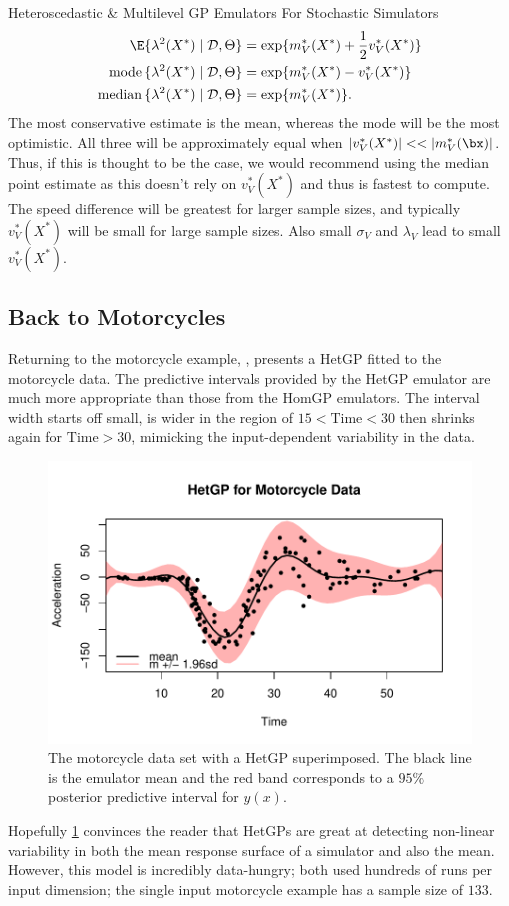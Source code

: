 \begin{chapter}{Heteroscedastic \& Multilevel GP Emulators For Stochastic Simulators\label{Ch:Hetsml}}
\begin{align}
	\E \{\lambda^2(X^*) \mid \mathcal{D}, \Theta \}  &= \exp \{ m_V^*(X^*) + \frac{1}{2}v_V^*(X^*) \}\\
	\text{mode}\, \{\lambda^2(X^*) \mid \mathcal{D}, \Theta \} &= \exp \{ m_V^*(X^*) - v_V^*(X^*) \}\\
	\text{median}\, \{\lambda^2(X^*) \mid \mathcal{D}, \Theta \} &= \exp \{ m_V^*(X^*)\}.
\end{align}
 The most conservative estimate is the mean, whereas the mode will be the most optimistic. All three will be approximately equal when $|v_V^*(X^*)|<<|m^*_V(\bx)|$. Thus, if this is thought to be the case, we would recommend using the median point estimate as this doesn't rely on $v_V^*(X^*)$ and thus is fastest to compute. The speed difference will be greatest for larger sample sizes, and typically $v_V^*(X^*)$ will be small for large sample sizes. Also small $\sigma_V$ and $\lambda_V$ lead to small $v_V^*(X^*)$.
\subsection{Back to Motorcycles}

Returning to the motorcycle example, , presents a HetGP fitted to the motorcycle data. The predictive intervals provided by the HetGP emulator are much more appropriate than those from the HomGP emulators. The interval width starts off small, is wider in the region of $15 < \text{Time} < 30$ then shrinks again for $\text{Time} > 30$, mimicking the input-dependent variability in the data.
\begin{figure}[ht]
	\includegraphics{fig-het-sml/mcycle-hetgp.pdf}
	\caption{The motorcycle data set with a HetGP superimposed. The black line is the emulator mean and the red band corresponds to a $95\%$ posterior predictive interval for $y(x)$.}
	\label{Fig:mcycle-het}
\end{figure}
Hopefully \cref{Fig:mcycle-het} convinces the reader that HetGPs are great at detecting non-linear variability in both the mean response surface of a simulator and also the mean. However, this model is incredibly data-hungry;  \citet{Binois2018, Zhang2020} both used hundreds of runs per input dimension; the single input motorcycle example has a sample size of $133$.

\end{chapter}
